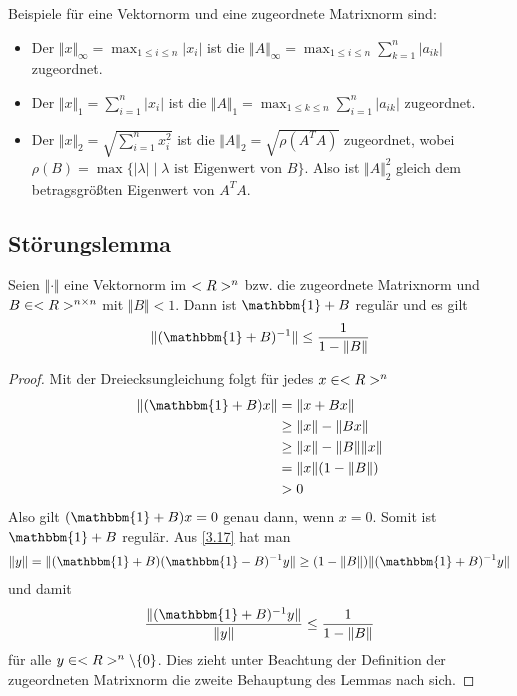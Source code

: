 Beispiele für eine Vektornorm und eine zugeordnete Matrixnorm sind:
\begin{itemize}
	\item Der  $\Vert x\Vert_\infty = \max_{1\le i\le n} \vert x_i\vert$ ist die  $\Vert A\Vert_\infty = \max_{1\le i\le n}\sum_{k=1}^{n}\vert a_{ik}\vert$ zugeordnet.
	\item Der  $\Vert x\Vert_1=\sum_{i=1}^n \vert x_i\vert$ ist die  $\Vert A\Vert_1 = \max_{1\le k\le n}\sum_{i=1}^n \vert a_{ik}\vert$ zugeordnet.
	\item Der  $\Vert x\Vert_2 = \sqrt{\sum_{i=1}^n x_i^2}$ ist die  $\Vert A\Vert_2 = \sqrt{\rho(A^TA)}$ zugeordnet, wobei $\rho(B)=\max\{\vert \lambda\vert\mid \lambda \text{ ist Eigenwert von } B\}$. Also ist $\Vert A\Vert_2^2$ gleich dem betragsgrößten Eigenwert von $A^TA$.
\end{itemize}

\subsection{Störungslemma}

\begin{lemma}
	Seien $\Vert\cdot\Vert$ eine Vektornorm im $<R>^n$ bzw. die zugeordnete Matrixnorm und $B\in<R>^{n\times n}$ mit $\Vert B\Vert<1$. Dann ist $\mathbbm{1}+B$ regulär und es gilt
	\begin{align}
		\Vert (\mathbbm{1}+B)^{-1}\Vert \le \frac{1}{1-\Vert B\Vert}\notag
	\end{align}
\end{lemma}
\begin{proof}
	Mit der Dreiecksungleichung folgt für jedes $x\in<R>^n$
	\begin{align}
		\label{3.17}
		\begin{split}
			\Vert (\mathbbm{1}+B)x\Vert &= \Vert x+Bx\Vert \\
			&\ge \Vert x\Vert - \Vert Bx\Vert \\
			&\ge \Vert x\Vert - \Vert B\Vert\Vert x\Vert \\
			&= \Vert x\Vert (1-\Vert B\Vert) \\
			&> 0
		\end{split}
	\end{align}
	Also gilt $(\mathbbm{1}+B)x=0$ genau dann, wenn $x=0$. Somit ist $\mathbbm{1}+B$ regulär. Aus \cref{3.17} hat man
	\begin{align}
		\Vert y\Vert = \Vert (\mathbbm{1}+B)(\mathbbm{1}-B)^{-1}y\Vert \ge (1-\Vert B\Vert)\Vert (\mathbbm{1}+B)^{-1}y\Vert \notag
	\end{align}
	und damit
	\begin{align}
		\frac{\Vert (\mathbbm{1}+B)^{-1}y\Vert}{\Vert y\Vert} \le \frac{1}{1-\Vert B\Vert}\notag
	\end{align}
	für alle $y\in<R>^n\backslash\{0\}$. Dies zieht unter Beachtung der Definition der zugeordneten Matrixnorm die zweite Behauptung des Lemmas nach sich.
\end{proof}

